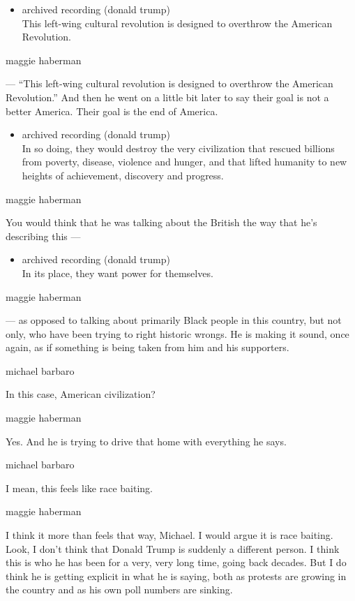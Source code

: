 \begin{itemize}
\tightlist
\item
  archived recording (donald trump)\\
  This left-wing cultural revolution is designed to overthrow the
  American Revolution.
\end{itemize}

maggie haberman

--- ``This left-wing cultural revolution is designed to overthrow the
American Revolution.'' And then he went on a little bit later to say
their goal is not a better America. Their goal is the end of America.

\begin{itemize}
\tightlist
\item
  archived recording (donald trump)\\
  In so doing, they would destroy the very civilization that rescued
  billions from poverty, disease, violence and hunger, and that lifted
  humanity to new heights of achievement, discovery and progress.
\end{itemize}

maggie haberman

You would think that he was talking about the British the way that he's
describing this ---

\begin{itemize}
\tightlist
\item
  archived recording (donald trump)\\
  In its place, they want power for themselves.
\end{itemize}

maggie haberman

--- as opposed to talking about primarily Black people in this country,
but not only, who have been trying to right historic wrongs. He is
making it sound, once again, as if something is being taken from him and
his supporters.

michael barbaro

In this case, American civilization?

maggie haberman

Yes. And he is trying to drive that home with everything he says.

michael barbaro

I mean, this feels like race baiting.

maggie haberman

I think it more than feels that way, Michael. I would argue it is race
baiting. Look, I don't think that Donald Trump is suddenly a different
person. I think this is who he has been for a very, very long time,
going back decades. But I do think he is getting explicit in what he is
saying, both as protests are growing in the country and as his own poll
numbers are sinking.

